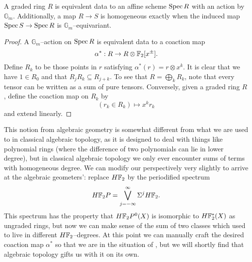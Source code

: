 \begin{lemma}\label{GradedAndGmEquivAgree}
A graded ring $R$ is equivalent data to an affine scheme $\operatorname{Spec} R$ with an action by $\mathbb G_m$.  Additionally, a map $R \to S$ is homogeneous exactly when the induced map $\operatorname{Spec} S \to \operatorname{Spec} R$ is $\mathbb G_m$--equivariant.
\end{lemma}
\begin{proof}
A $\mathbb G_m$--action on $\operatorname{Spec} R$ is equivalent data to a coaction map \[\alpha^*: R \to R \otimes \mathbb F_2[x^\pm].\]  Define $R_k$ to be those points in $r$ satisfying $\alpha^*(r) = r \otimes x^k$.  It is clear that we have $1 \in R_0$ and that $R_j R_k \subseteq R_{j+k}$.  To see that $R = \bigoplus_k R_k$, note that every tensor can be written as a sum of pure tensors.  Conversely, given a graded ring $R$, define the coaction map on $R_k$ by \[(r_k \in R_k) \mapsto x^k r_k\] and extend linearly.
\end{proof}

This notion from algebraic geometry is somewhat different from what we are used to in classical algebraic topology, as it is designed to deal with things like polynomial rings (where the difference of two polynomials can lie in lower degree), but in classical algebraic topology we only ever encounter sums of terms with homogeneous degree.  We can modify our perspectively very slightly to arrive at the algebraic geometers': replace $H\mathbb F_2$ by the periodified spectrum \[H\mathbb F_2P = \bigvee_{j=-\infty}^\infty \Sigma^j H\mathbb F_2.\]  This spectrum has the property that $H\mathbb F_2P^0(X)$ is isomorphic to $H\mathbb F_2^*(X)$ as ungraded rings, but now we can make sense of the sum of two classes which used to live in different $H\mathbb F_2$--degrees.  At this point we can manually craft the desired coaction map $\alpha^*$ so that we are in the situation of , but we will shortly find that algebraic topology gifts us with it on its own.

